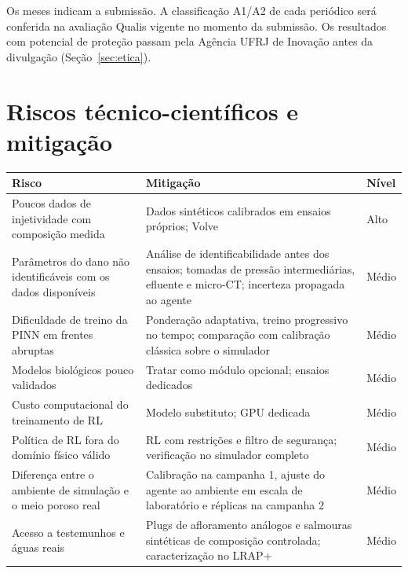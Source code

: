 \documentclass[11pt,a4paper]{article}
\newcommand{\itemedital}[1]{}
\begin{document}
\noindent Os meses indicam a submissão. A classificação A1/A2 de cada periódico será
conferida na avaliação Qualis vigente no momento da submissão. Os resultados com potencial
de proteção passam pela Agência UFRJ de Inovação antes da divulgação (Seção~\ref{sec:etica}).

\section{Riscos técnico-científicos e mitigação}\itemedital{2.16 XVII}

{\small{}
\begin{longtable}{@{}>{\raggedright\arraybackslash}p{}>{\raggedright\arraybackslash}p{}>{\raggedright\arraybackslash}p{}@{}}
\toprule
\textbf{Risco} & \textbf{Mitigação} & \textbf{Nível} \\
\midrule
\endhead
Poucos dados de injetividade com composição medida & Dados sintéticos calibrados em ensaios próprios; Volve & Alto \\
Parâmetros do dano não identificáveis com os dados disponíveis & Análise de identificabilidade antes dos ensaios; tomadas de pressão intermediárias, efluente e micro-CT; incerteza propagada ao agente & Médio \\
Dificuldade de treino da PINN em frentes abruptas & Ponderação adaptativa, treino progressivo no tempo; comparação com calibração clássica sobre o simulador & Médio \\
Modelos biológicos pouco validados & Tratar como módulo opcional; ensaios dedicados & Médio \\
Custo computacional do treinamento de RL & Modelo substituto; GPU dedicada & Médio \\
Política de RL fora do domínio físico válido & RL com restrições e filtro de segurança; verificação no simulador completo & Médio \\
Diferença entre o ambiente de simulação e o meio poroso real & Calibração na campanha 1, ajuste do agente ao ambiente em escala de laboratório e réplicas na campanha 2 & Médio \\
Acesso a testemunhos e águas reais & Plugs de afloramento análogos e salmouras sintéticas de composição controlada; caracterização no LRAP+ & Médio \\\bottomrule
\end{longtable}
}

\end{document}
